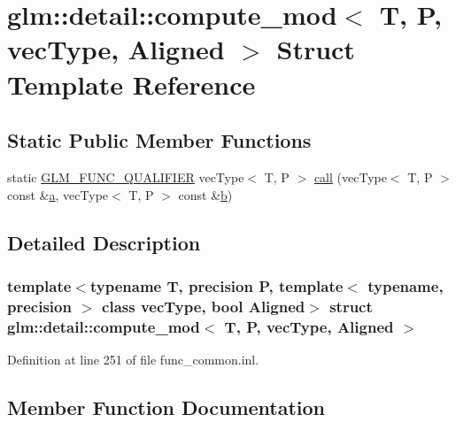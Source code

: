 \hypertarget{structglm_1_1detail_1_1compute__mod}{}\section{glm\+::detail\+::compute\+\_\+mod$<$ T, P, vec\+Type, Aligned $>$ Struct Template Reference}
\label{structglm_1_1detail_1_1compute__mod}
\subsection*{Static Public Member Functions}
\begin{DoxyCompactItemize}
\item 
static \mbox{\hyperlink{setup_8hpp_a33fdea6f91c5f834105f7415e2a64407}{G\+L\+M\+\_\+\+F\+U\+N\+C\+\_\+\+Q\+U\+A\+L\+I\+F\+I\+ER}} vec\+Type$<$ T, P $>$ \mbox{\hyperlink{structglm_1_1detail_1_1compute__mod_ade02ee494fe3e732a438962d23a8584b}{call}} (vec\+Type$<$ T, P $>$ const \&\mbox{\hyperlink{glad_8h_ac8729153468b5dcf13f971b21d84d4e5}{a}}, vec\+Type$<$ T, P $>$ const \&\mbox{\hyperlink{glad_8h_a6eba317e3cf44d6d26c04a5a8f197dcb}{b}})
\end{DoxyCompactItemize}


\subsection{Detailed Description}
\subsubsection*{template$<$typename T, precision P, template$<$ typename, precision $>$ class vec\+Type, bool Aligned$>$\newline
struct glm\+::detail\+::compute\+\_\+mod$<$ T, P, vec\+Type, Aligned $>$}



Definition at line 251 of file func\+\_\+common.\+inl.



\subsection{Member Function Documentation}
\mbox{\label{structglm_1_1detail_1_1compute__mod_ade02ee494fe3e732a438962d23a8584b}} 
